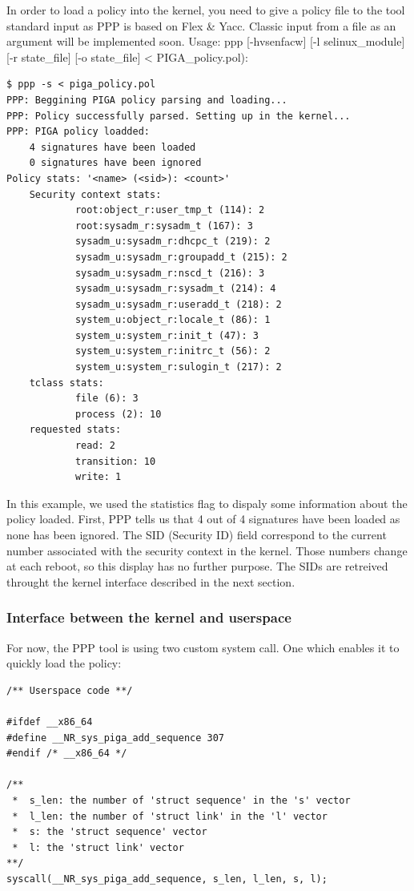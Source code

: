 \documentclass[pdftex,a4paper,titlepage,11pt]{article}
\begin{document}
\smallskip

In order to load a policy into the kernel, you need to give a policy file to the
tool standard input as PPP is based on Flex \& Yacc. Classic input from a file
as an argument will be implemented soon. Usage: ppp [-hvsenfacw] [-l
selinux\_module] [-r state\_file] [-o state\_file] < PIGA\_policy.pol):

\begin{lstlisting}
$ ppp -s < piga_policy.pol
PPP: Beggining PIGA policy parsing and loading...
PPP: Policy successfully parsed. Setting up in the kernel...
PPP: PIGA policy loadded:
    4 signatures have been loaded
    0 signatures have been ignored
Policy stats: '<name> (<sid>): <count>'
    Security context stats:
            root:object_r:user_tmp_t (114): 2
            root:sysadm_r:sysadm_t (167): 3
            sysadm_u:sysadm_r:dhcpc_t (219): 2
            sysadm_u:sysadm_r:groupadd_t (215): 2
            sysadm_u:sysadm_r:nscd_t (216): 3
            sysadm_u:sysadm_r:sysadm_t (214): 4
            sysadm_u:sysadm_r:useradd_t (218): 2
            system_u:object_r:locale_t (86): 1
            system_u:system_r:init_t (47): 3
            system_u:system_r:initrc_t (56): 2
            system_u:system_r:sulogin_t (217): 2
    tclass stats:
            file (6): 3
            process (2): 10
    requested stats:
            read: 2
            transition: 10
            write: 1
\end{lstlisting}

\smallskip

In this example, we used the statistics flag to dispaly some information about
the policy loaded. First, PPP tells us that 4 out of 4 signatures have been
loaded as none has been ignored. The SID (Security ID) field correspond to the
current number associated with the security context in the kernel. Those numbers
change at each reboot, so this display has no further purpose. The SIDs are
retreived throught the kernel interface described in the next section.

\subsubsection{Interface between the kernel and userspace}

For now, the PPP tool is using two custom system call. One which enables it to
quickly load the policy:

\begin{lstlisting}
/** Userspace code **/

#ifdef __x86_64
#define __NR_sys_piga_add_sequence 307
#endif /* __x86_64 */

/**
 *  s_len: the number of 'struct sequence' in the 's' vector
 *  l_len: the number of 'struct link' in the 'l' vector
 *  s: the 'struct sequence' vector
 *  l: the 'struct link' vector
**/
syscall(__NR_sys_piga_add_sequence, s_len, l_len, s, l);
\end{lstlisting}
\end{document}
